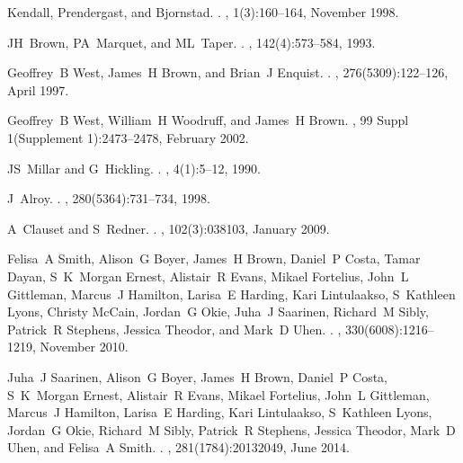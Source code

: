 \documentclass[twocolumn,preprintnumbers,amsmath,amssymb,superscriptaddress]{revtex4}
\begin{document}
\begin{bibunit}[unsrt]
\begin{thebibliography}{10}
Kendall, Prendergast, and Bjornstad.
.
, 1(3):160--164, November 1998.

JH~Brown, PA~Marquet, and ML~Taper.
.
, 142(4):573--584, 1993.

Geoffrey~B West, James~H Brown, and Brian~J Enquist.
.
, 276(5309):122--126, April 1997.

Geoffrey~B West, William~H Woodruff, and James~H Brown.
, 99 Suppl 1(Supplement
  1):2473--2478, February 2002.

JS~Millar and G~Hickling.
.
, 4(1):5--12, 1990.

J~Alroy.
.
, 280(5364):731--734, 1998.

A~Clauset and S~Redner.
.
, 102(3):038103, January 2009.

Felisa~A Smith, Alison~G Boyer, James~H Brown, Daniel~P Costa, Tamar Dayan,
  S~K~Morgan Ernest, Alistair~R Evans, Mikael Fortelius, John~L Gittleman,
  Marcus~J Hamilton, Larisa~E Harding, Kari Lintulaakso, S~Kathleen Lyons,
  Christy McCain, Jordan~G Okie, Juha~J Saarinen, Richard~M Sibly, Patrick~R
  Stephens, Jessica Theodor, and Mark~D Uhen.
.
, 330(6008):1216--1219, November 2010.

Juha~J Saarinen, Alison~G Boyer, James~H Brown, Daniel~P Costa, S~K~Morgan
  Ernest, Alistair~R Evans, Mikael Fortelius, John~L Gittleman, Marcus~J
  Hamilton, Larisa~E Harding, Kari Lintulaakso, S~Kathleen Lyons, Jordan~G
  Okie, Richard~M Sibly, Patrick~R Stephens, Jessica Theodor, Mark~D Uhen, and
  Felisa~A Smith.
.
, 281(1784):20132049, June 2014.


\end{thebibliography}
\end{bibunit}
\end{document}
